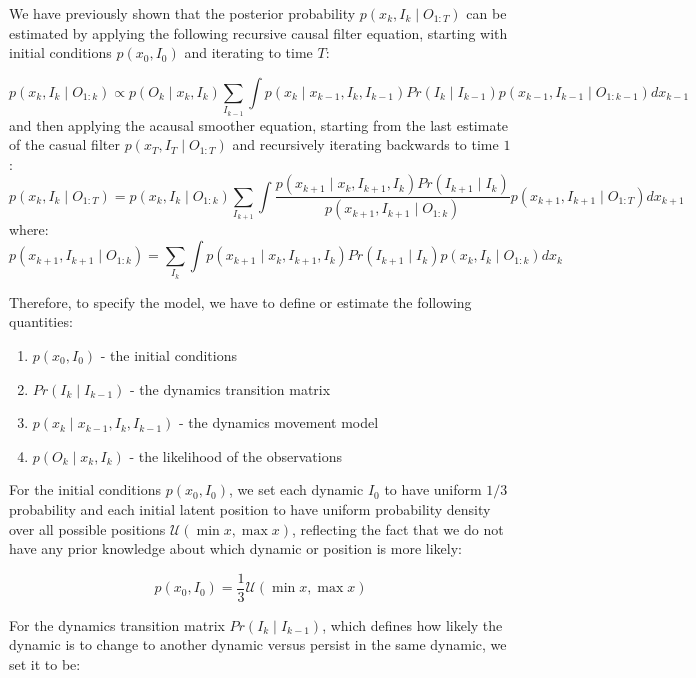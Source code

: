 \documentclass[times, twoside]{zHenriquesLab-StyleBioRxiv}
\begin{document}
We have previously shown \cite{DenovellisCharacterizinghippocampalreplay2019} that the posterior probability $p(x_k, I_k \mid O_{1:T})$ can be estimated by applying the following recursive causal filter equation, starting with initial conditions $p(x_{0}, I_{0})$ and iterating to time $T$:

$$
p(x_{k}, I_{k} \mid O_{1:k}) \propto
p(O_{k}  \mid x_{k}, I_{k}) \sum_{I_{k-1}} \int p(x_{k} \mid x_{k-1}, I_{k}, I_{k-1}) 
Pr(I_{k} \mid I_{k-1}) p(x_{k-1}, I_{k-1} \mid O_{1:k-1}) dx_{k-1}
$$
and then applying the acausal smoother equation, starting from the last estimate of the casual filter $p(x_{T}, I_{T} \mid O_{1:T})$ and recursively iterating backwards to time $1$:
$$
p(x_{k}, I_{k} \mid O_{1:T}) =
p(x_{k}, I_{k} \mid O_{1:k})
\sum_{I_{k+1}} \int \frac{p(x_{k+1} \mid x_{k}, I_{k+1}, I_{k})
Pr(I_{k+1} \mid I_{k})}{p(x_{k+1}, I_{k+1} \mid O_{1:k})}
p(x_{k+1}, I_{k+1} \mid O_{1:T}) dx_{k+1}
$$
where:
$$
p(x_{k+1}, I_{k+1} \mid O_{1:k}) =
\sum_{I_{k}} \int p(x_{k+1} \mid x_{k}, I_{k+1}, I_{k}) Pr(I_{k+1} \mid I_{k})
p(x_{k}, I_{k} \mid O_{1:k}) dx_{k}
$$

Therefore, to specify the model, we have to define or estimate the following quantities:
\begin{enumerate}
  \item $p(x_{0}, I_{0})$ - the initial conditions
  \item $Pr(I_{k} \mid I_{k-1})$ - the dynamics transition matrix
  \item $p(x_{k} \mid x_{k-1}, I_{k}, I_{k-1})$ - the dynamics movement model
  \item $p(O_{k}  \mid x_{k}, I_{k})$ - the likelihood of the observations
\end{enumerate}

For the initial conditions $p(x_{0}, I_{0})$, we set each dynamic $I_0$ to have uniform $1/3$ probability and each initial latent position to have uniform probability density over all possible positions $\mathcal{U}(\min x, \max x)$, reflecting the fact that we do not have any prior knowledge about which dynamic or position is more likely:

\begin{equation*}
  p(x_{0}, I_{0}) = \frac{1}{3} \mathcal{U}(\min x, \max x)
\end{equation*}

For the dynamics transition matrix $Pr(I_{k} \mid I_{k-1})$, which defines how likely the dynamic is to change to another dynamic versus persist in the same dynamic, we set it to be:
\end{document}
